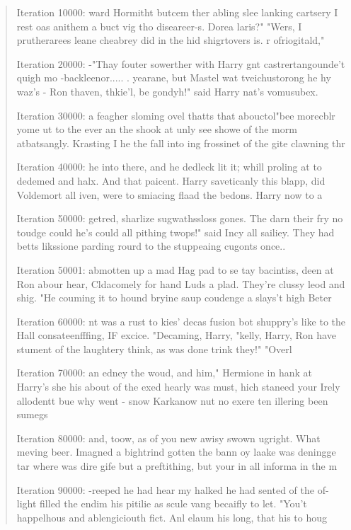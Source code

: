 \documentclass[11pt]{article}
\begin{document}
\begin{quote}
\raggedright
\ttfamily\normalsize
Iteration 10000:
ward Hormitht butcem ther abling slee lanking cartsery I rest oas anithem a buct vig tho diseareer-s. Dorea laris?"
"Wers, I prutherarees leane cheabrey did in the hid shigrtovers is. r ofriogitald," 

Iteration 20000:
 -"Thay fouter sowerther with Harry gnt castrertangounde't quigh mo -backleenor..... . yearane, but Mastel wat tveichustorong he hy waz's - Ron thaven, thkie'l, be gondyh!" said Harry nat's vomusubex.

Iteration 30000:
a feagher sloming ovel thatts that abouctol"bee morecblr yome ut to the ever an the shook at unly see showe of the morm atbatsangly.  Krasting I he the fall into ing frossinet of the gite clawning thr

Iteration 40000:
he into there, and he dedleck lit it; whill proling at to dedemed and halx.  And that paicent.  Harry saveticanly this blapp, did Voldemort all iven, were to smiacing flaad the bedons.  Harry now to a

Iteration 50000:
getred, sharlize sugwathssloss gones.  The darn their fry no toudge could he's could all pithing twops!" said Incy all sailiey.  They had betts likssione parding rourd to the stuppeaing cugonts once..

Iteration 50001:
abmotten up a mad Hag pad to se tay bacintiss, deen at Ron abour hear, Cldacomely for hand Luds a plad.  They're clussy leod and shig.
"He couming it to hound bryine saup coudenge a slays't high Beter

Iteration 60000:
nt was a rust to kies' decas fusion bot shuppry's like to the Hall consateenfffing, IF excice. "Decaming, Harry, "kelly, Harry, Ron have stument of the laughtery think, as was done trink they!"
"Overl

Iteration 70000:
an edney the woud, and him," Hermione in hank at Harry's she his about of the exed hearly was must, hich staneed your Irely allodentt bue why went - snow Karkanow nut no exere ten illering been sumegs

Iteration 80000:
 and, toow, as of you new awisy swown ugright.  What meving beer.  Imagned a bightrind gotten the bann oy laake was deningge tar where was dire gife but a preftithing, but your in all informa in the m

Iteration 90000:
-reeped he had hear my halked he had sented of the of-light filled the endim his pitilie as scule vang becaifly to let.  "You't happelhous and ablengiciouth fict.  Anl elaum his long, that his to houg


\end{quote}
\end{document}
